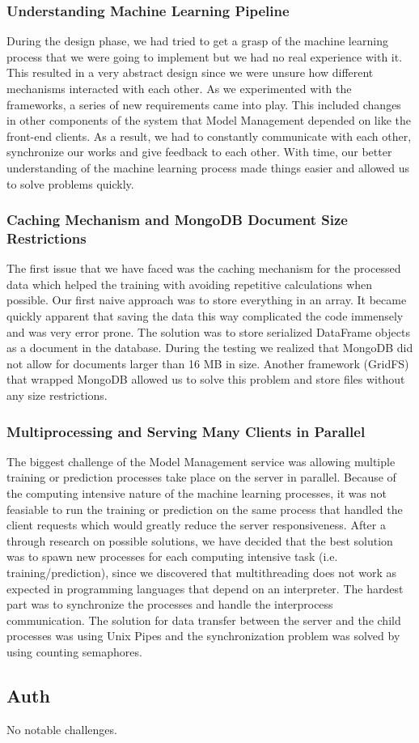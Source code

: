 \subsubsection{Understanding Machine Learning Pipeline}
During the design phase, we had tried to get a grasp of the machine learning
process that we were going to implement but we had no real experience with it.
This resulted in a very abstract design since we were unsure how different
mechanisms interacted with each other. As we experimented with the frameworks,
a series of new requirements came into play. This included changes in other
components of the system that Model Management depended on like the front-end
clients. As a result, we had to constantly communicate with each
other, synchronize our works and give feedback to each other. With time, our
better understanding of the machine learning process made things easier and
allowed us to solve problems quickly.

\subsubsection{Caching Mechanism and MongoDB Document Size Restrictions}
The first issue that we have faced was the caching mechanism for the processed
data which helped the training with avoiding repetitive calculations when
possible. Our first naive approach was to store everything in an array. It
became quickly apparent that saving the data this way complicated the code
immensely and was very error prone. The solution was to store serialized
DataFrame objects as a document in the database. During the testing we realized
that MongoDB did not allow for documents larger than 16 MB in size. Another
framework (GridFS) that wrapped MongoDB allowed us to solve this problem and
store files without any size restrictions.

\subsubsection{Multiprocessing and Serving Many Clients in Parallel}
The biggest challenge of the Model Management service was allowing multiple
training or prediction processes take place on the server in parallel. Because
of the computing intensive nature of the machine learning processes, it was
not feasiable to run the training or prediction on the same process that handled
the client requests which would greatly reduce the server responsiveness.
After a through research on possible solutions, we have decided that the 
best solution was to spawn new processes for each computing intensive task (i.e.
training/prediction), since we discovered that multithreading does not work as
expected in programming languages that depend on an interpreter. The hardest part
was to synchronize the processes and handle the interprocess communication. The solution for data transfer between
the server and the child processes was using Unix Pipes and the synchronization
problem was solved by using counting semaphores.
\subsection{Auth}
No notable challenges.
